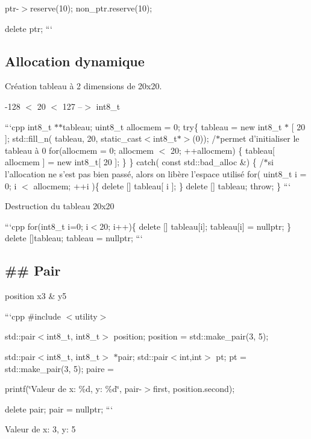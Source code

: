 ptr-\/$>$reserve(10); non\-\_\-ptr.\-reserve(10);

delete ptr; ```

\subsection*{Allocation dynamique}






\begin{DoxyItemize}
\item Création tableau à 2 dimensions de 20x20.
\item -\/128 $<$ 20 $<$ 127 --$>$ int8\-\_\-t
\end{DoxyItemize}

```cpp int8\-\_\-t $\ast$$\ast$tableau; uint8\-\_\-t allocmem = 0; try\{ tableau = new int8\-\_\-t $\ast$ \mbox{[} 20 \mbox{]}; std\-::fill\-\_\-n( tableau, 20, static\-\_\-cast$<$int8\-\_\-t$\ast$$>$(0)); /$\ast$permet d'initialiser le tableau à 0 for(allocmem = 0; allocmem $<$ 20; ++allocmem) \{ tableau\mbox{[} allocmem \mbox{]} = new int8\-\_\-t\mbox{[} 20 \mbox{]}; \} \} catch( const std\-::bad\-\_\-alloc \&) \{ /$\ast$si l'allocation ne s'est pas bien passé, alors on libère l'espace utilisé for( uint8\-\_\-t i = 0; i $<$ allocmem; ++i )\{ delete \mbox{[}\mbox{]} tableau\mbox{[} i \mbox{]}; \} delete \mbox{[}\mbox{]} tableau; throw; \} ```


\begin{DoxyItemize}
\item Destruction du tableau 20x20
\end{DoxyItemize}

```cpp for(int8\-\_\-t i=0; i$<$20; i++)\{ delete \mbox{[}\mbox{]} tableau\mbox{[}i\mbox{]}; tableau\mbox{[}i\mbox{]} = nullptr; \} delete \mbox{[}\mbox{]}tableau; tableau = nullptr; ```

\subsection*{\#\# Pair }


\begin{DoxyItemize}
\item position x3 \& y5
\end{DoxyItemize}

```cpp \#include $<$utility$>$

std\-::pair$<$int8\-\_\-t, int8\-\_\-t$>$ position; position = std\-::make\-\_\-pair(3, 5);

std\-::pair$<$int8\-\_\-t, int8\-\_\-t$>$ $\ast$pair; std\-::pair$<$int,int$>$ pt; pt = std\-::make\-\_\-pair(3, 5); paire = 

printf(\char`\"{}\-Valeur de x\-: \%d, y\-: \%d\char`\"{}, pair-\/$>$first, position.\-second);

delete pair; pair = nullptr; ```

{\ttfamily Valeur de x\-: 3, y\-: 5} 